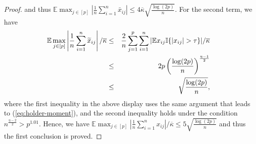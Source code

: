 \begin{proof}
and thus $\mathbb{E}\max_{j\in[p]}\left|\frac{1}{n}\sum_{i=1}^n\bar{x}_{ij}\right|\leq 4\overline{\kappa}\sqrt{\frac{\log (2p)}{n}}$. For the second term, we have
\begin{eqnarray*}
\mathbb{E}\max_{j\in[p]}\left|\frac{1}{n}\sum_{i=1}^n\wt{x}_{ij}\right|/\overline{\kappa} &\leq& \frac{2}{n}\sum_{j=1}^p\sum_{i=1}^n|\mathbb{E}x_{ij}\mathbb{I}\{|x_{ij}|>\tau\}|/\overline{\kappa} \\
&\leq& 2p\left(\frac{\log (2p)}{n}\right)^{\frac{\eta-1}{2}} \\
&\leq& \sqrt{\frac{\log (2p)}{n}},
\end{eqnarray*}
where the first inequality in the above display uses the same argument that leads to (\ref{eq:holder-moment}), and the second inequality holds under the condition $n^{\frac{\eta-2}{2}}>p^{1.01}$. Hence, we have $\mathbb{E}\max_{j\in[p]}\left|\frac{1}{n}\sum_{i=1}^n{x}_{ij}\right|/\overline{\kappa}\leq 5\sqrt{\frac{\log (2p)}{n}}$ and thus the first conclusion is proved.


\end{proof}
